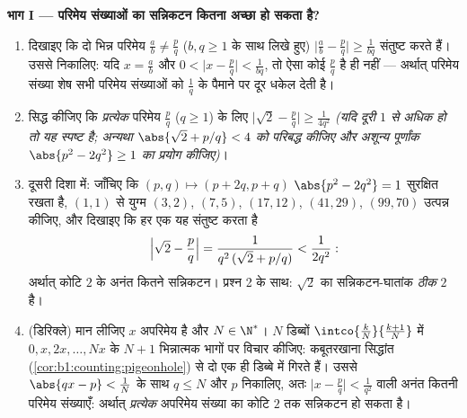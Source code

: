 \begin{problem}
\medskip \noindent\textbf{भाग I --- परिमेय संख्याओं का सन्निकटन कितना अच्छा
हो सकता है?}
\begin{enumerate}
  \item दिखाइए कि दो भिन्न परिमेय $\frac ab \neq \frac pq$ ($b, q \geq 1$ के
  साथ लिखे हुए) $\bigl|\frac ab - \frac pq\bigr| \geq \frac{1}{bq}$ संतुष्ट
  करते हैं। उससे निकालिए: यदि $x = \frac ab$ और $0 < \bigl|x - \frac
  pq\bigr| < \frac{1}{bq}$, तो ऐसा कोई $\frac pq$ है ही नहीं --- अर्थात्
  परिमेय संख्या शेष सभी परिमेय संख्याओं को $\frac 1q$ के पैमाने पर दूर धकेल
  देती है।
  \item सिद्ध कीजिए कि \emph{प्रत्येक} परिमेय $\frac pq$ ($q \geq 1$) के लिए
  $\bigl|\sqrt2 - \frac pq\bigr| \geq \frac{1}{4q^2}$ \emph{(यदि दूरी $1$ से
  अधिक हो तो यह स्पष्ट है; अन्यथा $\abs{\sqrt2 + p/q} < 4$ को परिबद्ध कीजिए
  और अशून्य पूर्णांक $\abs{p^2 - 2q^2} \geq 1$ का प्रयोग कीजिए)}।
  \item दूसरी दिशा में: जाँचिए कि $(p, q) \mapsto (p + 2q, p + q)$ $\abs{p^2
  - 2q^2} = 1$ सुरक्षित रखता है, $(1,1)$ से युग्म $(3,2)$, $(7,5)$,
  $(17,12)$, $(41,29)$, $(99,70)$ उत्पन्न कीजिए, और दिखाइए कि हर एक यह
  संतुष्ट करता है
        \[
        \Bigl|\sqrt2 - \frac pq\Bigr| =
        \frac{1}{q^2\,(\sqrt2 + p/q)} < \frac{1}{2q^2} :
        \]
        अर्थात् कोटि $2$ के अनंत कितने सन्निकटन। प्रश्न 2 के साथ: $\sqrt 2$
        का सन्निकटन-घातांक \emph{ठीक} $2$ है।
  \item (डिरिक्ले) मान लीजिए $x$ अपरिमेय है और $N \in \N^*$। $N$ डिब्बों
  $\intco{\frac kN}{\frac{k + 1}{N}}$ में $0, x, 2x, \dots, Nx$ के $N + 1$
  भिन्नात्मक भागों पर विचार कीजिए: कबूतरखाना सिद्धांत
  (\cref{cor:b1:counting:pigeonhole}) से दो एक ही डिब्बे में गिरते हैं। उससे
  $\abs{qx - p} < \frac 1N$ के साथ $q \leq N$ और $p$ निकालिए, अतः $\bigl|x -
  \frac pq\bigr| < \frac{1}{q^2}$ वाली अनंत कितनी परिमेय संख्याएँ: अर्थात्
  \emph{प्रत्येक} अपरिमेय संख्या का कोटि $2$ तक सन्निकटन हो सकता है।
\end{enumerate}


\end{problem}
